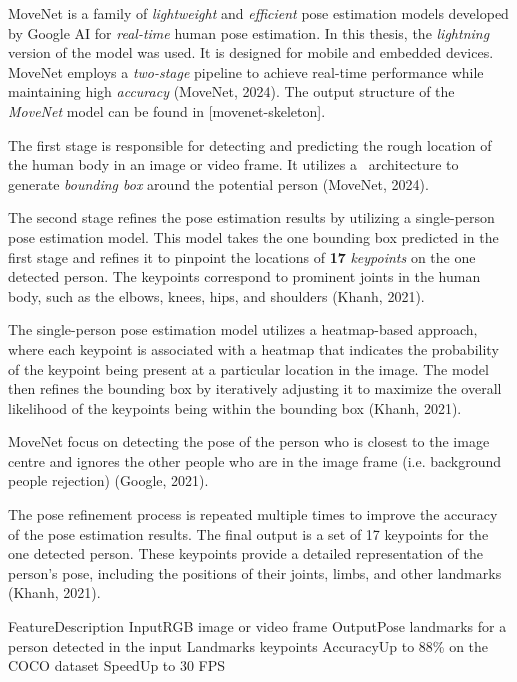 MoveNet is a family of {\em lightweight} and {\em efficient} pose estimation models developed by Google AI for {\em real-time} human pose estimation. In this thesis, the {\em lightning} version of the model was used. It is designed for mobile and embedded devices. MoveNet employs a {\em two-stage} pipeline to achieve real-time performance while maintaining high {\em accuracy} (\scc MoveNet, 2024). The output structure of the {\em MoveNet} model can be found in [movenet-skeleton].

The first stage is responsible for detecting and predicting the rough location of the human body in an image or video frame. It utilizes a \SSD\ architecture to generate {\em bounding box} around the potential person (\scc MoveNet, 2024).

The second stage refines the pose estimation results by utilizing a single-person pose estimation model. This model takes the one bounding box predicted in the first stage and refines it to pinpoint the locations of {\bf 17} {\em keypoints} on the one detected person. The keypoints correspond to prominent joints in the human body, such as the elbows, knees, hips, and shoulders (\scc Khanh, 2021).

The single-person pose estimation model utilizes a heatmap-based approach, where each keypoint is associated with a heatmap that indicates the probability of the keypoint being present at a particular location in the image. The model then refines the bounding box by iteratively adjusting it to maximize the overall likelihood of the keypoints being within the bounding box (\scc Khanh, 2021).

MoveNet focus on detecting the pose of the person who is closest to the image centre and ignores the other people who are in the image frame (i.e. background people rejection) (\scc Google, 2021).

The pose refinement process is repeated multiple times to improve the accuracy of the pose estimation results. The final output is a set of 17 keypoints for the one detected person. These keypoints provide a detailed representation of the person's pose, including the positions of their joints, limbs, and other landmarks (\scc Khanh, 2021).

    \setupTABLE[r][1][style=bold]
    \setupTABLE[c][each][offset=3dd]
    \setupTABLE[frame=off]
    \setupTABLE[r][1][topframe=on,bottomframe=on]
    \setupTABLE[c][each][leftframe=on]
    \setupTABLE[c][1][leftframe=off]
    \bTR
        \bTD Feature\eTD\bTD    Description\eTD\eTR
    \bTR
        \bTD Input\eTD\bTD      RGB image or video frame\eTD\eTR
    \bTR
        \bTD Output\eTD\bTD     Pose landmarks for a person detected in the input\eTD\eTR
    \bTR
        \bTD Landmarks\eTD{} keypoints\eTD\eTR
    \bTR
        \bTD Accuracy\eTD\bTD   Up to 88\% on the COCO dataset\eTD\eTR
    \bTR
        \bTD Speed\eTD\bTD      Up to 30 FPS\eTD\eTR

